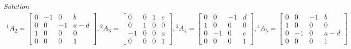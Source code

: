 \documentclass{article}
\numberwithin{prob}{section}
\newenvironment{solution}{\emph{Solution}}{}
\begin{document}
\begin{solution}
\begin{align}
  {}^1A_2 = \begin{bmatrix}
    0 & -1 &  0 & b \\
    0 &  0 & -1 & a-d\\
    1 &  0 &  0 & 0\\
    0 &  0 &  0 & 1
  \end{bmatrix}
  ,
  {}^2A_3 = \begin{bmatrix}
     0 & 0 &  1 & e\\
     0 & 1 &  0 & 0\\
     -1 & 0 & 0 & a\\
     0 & 0 &  0 & 1
  \end{bmatrix}
  ,
  {}^3A_4 = \begin{bmatrix}
     0 &  0 & -1 & d\\
     1 &  0 &  0 & 0\\
     0 & -1 &  0 & c\\
     0 & 0 &  0  & 1
  \end{bmatrix}
  ,
  {}^4A_5 = \begin{bmatrix}
     0 &  0 & -1 & b\\
     1 &  0 &  0 & 0\\
     0 & -1 &  0 & a-d\\
     0 &  0 &  0 & 1
  \end{bmatrix}
\end{align}
\end{solution}
\end{document}
